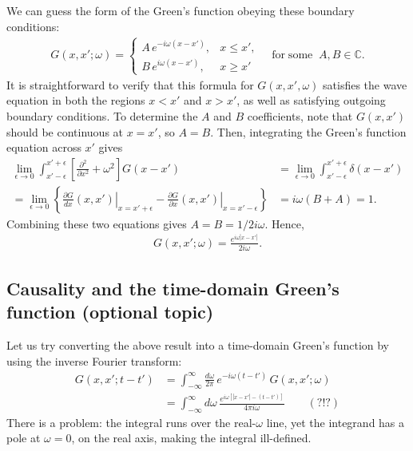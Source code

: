 \documentclass[10pt,a4paper]{article}
\begin{document}
We can guess the form of the Green's function obeying these boundary
conditions:
\begin{align}
  G(x,x';\omega) = \left\{\begin{array}{ll}A \, e^{-i\omega (x-x')}, & x \le x', \\ B \, e^{i\omega (x-x')}, & x \ge x'\end{array}\right. \quad \mathrm{for}\;\mathrm{some}\;\; A, B \in \mathbb{C}.
\end{align}
It is straightforward to verify that this formula for $G(x,x',\omega)$
satisfies the wave equation in both the regions $x < x'$ and $x > x'$,
as well as satisfying outgoing boundary conditions.  To determine the
$A$ and $B$ coefficients, note that $G(x,x')$ should be continuous at
$x = x'$, so $A = B$. Then, integrating the Green's function equation
across $x'$ gives
\begin{align}
  \lim_{\epsilon \rightarrow 0} \int_{x'-\epsilon}^{x'+\epsilon} \left[\frac{\partial^2}{\partial x^2} + \omega^2\right]G(x-x') &= \lim_{\epsilon \rightarrow 0} \int_{x'-\epsilon}^{x'+\epsilon} \delta(x-x') \\
  = \lim_{\epsilon \rightarrow 0} \left\{ \left.\frac{\partial G}{dx} (x,x') \right|_{x = x'+\epsilon} - \left.\frac{\partial G}{\partial x} (x,x') \right|_{x = x'-\epsilon}\right\} &= i\omega (B + A) = 1.
\end{align}
Combining these two equations gives $A = B = 1/2i\omega$.  Hence,
\begin{align}
  G(x,x';\omega) = \frac{e^{i\omega |x-x'|}}{2i\omega}.
\end{align}

\subsection{Causality and the time-domain Green's function (optional topic)}
\label{causality-and-the-time-domain-greens-function}

Let us try converting the above result into a time-domain Green's
function by using the inverse Fourier transform:
\begin{align}
  G(x,x';t-t') &= \int_{-\infty}^\infty \frac{d\omega}{2\pi} \, e^{-i\omega (t-t')} \, G(x,x'; \omega) \\
  &= \int_{-\infty}^\infty d\omega \, \frac{e^{i\omega \left[|x-x'| - (t-t')\right]}}{4\pi i\omega}\qquad (?!?)
\end{align}
There is a problem: the integral runs over the real-$\omega$ line, yet
the integrand has a pole at $\omega = 0$, on the real axis, making the
integral ill-defined.
\end{document}
